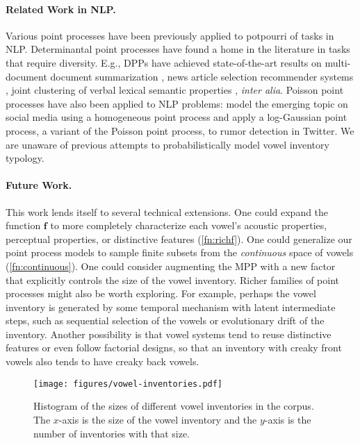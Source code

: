 \documentclass[11pt,a4paper]{article}
\renewcommand{\cite}[2][]{\citep[#1]{#2}}
\renewcommand{\newcite}[2][]{\citet[#1]{#2}}
\newcommand{\f}{{\boldsymbol f}}
\begin{document}
\paragraph{Related Work in NLP.}
Various point processes have been previously applied to potpourri of
tasks in NLP. Determinantal point processes have found a home in the
literature in tasks that require diversity. E.g., DPPs have achieved
state-of-the-art results on multi-document document summarization
\cite{KuleszaT11}, news article selection \cite{AffandiKF12}
recommender systems \cite{GartrellPK16}, joint clustering of verbal
lexical semantic properties \cite{reichart2013improved}, {\em inter alia}.
Poisson point processes have also been applied to NLP
problems: \newcite{yee2015modeling} model the emerging topic on social
media using a homogeneous point process and \newcite{LukasikCB15} apply
a log-Gaussian point process, a variant of the Poisson
point process, to rumor detection in Twitter.
We are unaware of previous attempts to probabilistically model vowel inventory typology.

\paragraph{Future Work.}
This work lends itself to several technical extensions.  One could expand the function $\f$ to more completely characterize each vowel's acoustic properties, perceptual properties, or distinctive features (\cref{fn:richf}).  One could generalize our point process models to sample finite subsets from the {\em continuous} space of vowels (\cref{fn:continuous}).  One could consider augmenting the MPP with a new factor that explicitly controls the size of the vowel inventory.  Richer families of point processes might also be worth exploring.  For example, perhaps the vowel inventory is generated by some temporal mechanism with latent intermediate steps, such as sequential selection of the vowels or evolutionary drift of the inventory.  Another possibility is that vowel systems tend to reuse distinctive features or even follow factorial designs, so that an inventory with creaky front vowels also tends to have creaky back vowels.

\begin{figure}
  \texttt{[image: figures/vowel-inventories.pdf]}
  \caption{Histogram of the sizes of different vowel inventories in
    the corpus. The $x$-axis is the size of the vowel inventory and
    the $y$-axis is the number of inventories with that
    size.}
  \label{fig:vowel-inventories}
\end{figure}
\end{document}
